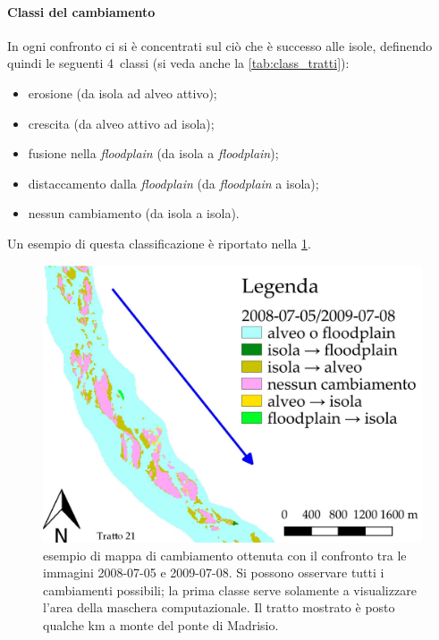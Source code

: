 \paragraph{Classi del cambiamento}
In ogni confronto ci si è concentrati sul ciò che è successo alle isole, definendo quindi le seguenti 4~classi (si veda anche la \cref{tab:class_tratti}):
%
\begin{itemize}
	\item erosione (da isola ad alveo attivo);
	\item crescita (da alveo attivo ad isola);
	\item fusione nella \emph{floodplain} (da isola a \emph{floodplain});
	\item distaccamento dalla \emph{floodplain} (da \emph{floodplain} a isola);
	\item nessun cambiamento (da isola a isola).
\end{itemize}
%
Un esempio di questa classificazione è riportato nella \cref{fig:confr-class-is-fl}.
%
\begin{figure}
	\centering
	\includegraphics[width=.8\textwidth]{files/confr_class_is_fl.jpeg}
	\caption[esempio di mappa di cambiamento]{esempio di mappa di cambiamento ottenuta con il confronto tra le immagini \AST{} 2008-07-05 e 2009-07-08. Si possono osservare tutti i cambiamenti possibili; la prima classe serve solamente a visualizzare l'area della maschera computazionale. Il tratto mostrato è posto qualche \si{\kilo\m} a monte del ponte di Madrisio.}
	\label{fig:confr-class-is-fl}
\end{figure}
%


